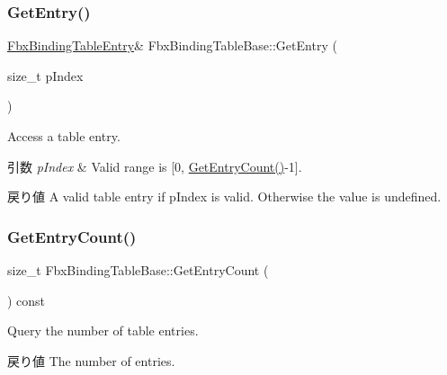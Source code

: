 \subsubsection{\texorpdfstring{Get\+Entry()}{GetEntry()}\hspace{0.1cm}{\footnotesize\ttfamily [2/2]}}
{\footnotesize\ttfamily \hyperlink{class_fbx_binding_table_entry}{Fbx\+Binding\+Table\+Entry}\& Fbx\+Binding\+Table\+Base\+::\+Get\+Entry (\begin{DoxyParamCaption}\item[{size\+\_\+t}]{p\+Index }\end{DoxyParamCaption})}

Access a table entry. 
\begin{DoxyParams}{引数}
{\em p\+Index} & Valid range is \mbox{[}0, \hyperlink{class_fbx_binding_table_base_a0a5379cd46e7e6dcf6f48bbd262034d8}{Get\+Entry\+Count()}-\/1\mbox{]}. \\
\hline
\end{DoxyParams}
\begin{DoxyReturn}{戻り値}
A valid table entry if p\+Index is valid. Otherwise the value is undefined. 
\end{DoxyReturn}
\mbox{\label{class_fbx_binding_table_base_a0a5379cd46e7e6dcf6f48bbd262034d8}} 
\subsubsection{\texorpdfstring{Get\+Entry\+Count()}{GetEntryCount()}}
{\footnotesize\ttfamily size\+\_\+t Fbx\+Binding\+Table\+Base\+::\+Get\+Entry\+Count (\begin{DoxyParamCaption}{ }\end{DoxyParamCaption}) const}

Query the number of table entries. \begin{DoxyReturn}{戻り値}
The number of entries. 
\end{DoxyReturn}
\mbox{\label{class_fbx_binding_table_base_a458be38b5f0998c672d276989d278cb2}} 
